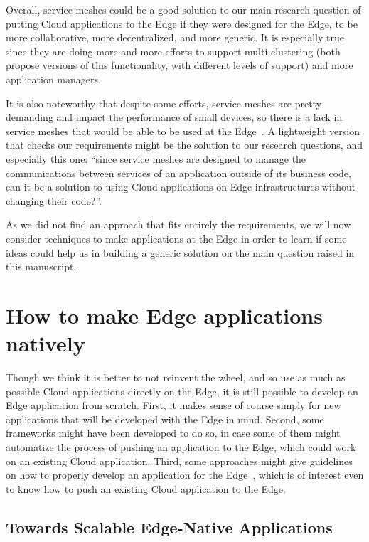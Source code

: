 Overall, service meshes could be a good solution to our main research
question of putting Cloud applications to the Edge if they were
designed for the Edge, to be more collaborative, more decentralized,
and more generic.
%
It is especially true since they are doing more and more efforts to
support multi-clustering (both propose versions of this functionality,
with different levels of support) and more application managers.

It is also noteworthy that despite some efforts, service meshes are
pretty demanding and impact the performance of small devices, so there
is a lack in service meshes that would be able to be used at the
Edge~\cite{GRRL+21}.
%
A lightweight version that checks our requirements might be the
solution to our research questions, and especially this one: ``since
service meshes are designed to manage the communications between
services of an application outside of its business code, can it be a
solution to using Cloud applications on Edge infrastructures without
changing their code?''.


As we did not find an approach that fits entirely the requirements, we
will now consider techniques to make applications at the Edge in order
to learn if some ideas could help us in building a generic solution on
the main question raised in this manuscript.



\chapter{How to make Edge applications natively}
\label{chap:soa-dev-edge-app}

Though we think it is better to not reinvent the wheel, and so use as
much as possible Cloud applications directly on the Edge, it is still
possible to develop an Edge application from scratch.
%
First, it makes sense of course simply for new applications that will
be developed with the Edge in mind.
%
Second, some frameworks might have been developed to do so, in case
some of them might automatize the process of pushing an application to
the Edge, which could work on an existing Cloud application.
%
Third, some approaches might give guidelines on how to properly
develop an application for the Edge~\cite{RYHL19}, which is of interest even to know
how to push an existing Cloud application to the Edge.

\section{Towards Scalable Edge-Native Applications~\cite{WFGI+19}}
\label{sec:WFGI+19}

